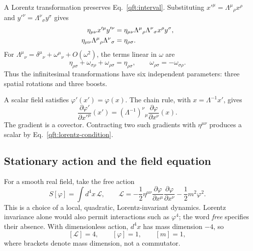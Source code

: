 A Lorentz transformation preserves Eq.~\eqref{qft:interval}. Substituting
$x'^\mu=\Lambda^\mu{}_{\rho}x^\rho$ and
$y'^\nu=\Lambda^\nu{}_{\sigma}y^\sigma$ gives
\begin{align}
 \eta_{\mu\nu}x'^\mu y'^\nu
 &=\eta_{\mu\nu}\Lambda^\mu{}_{\rho}
       \Lambda^\nu{}_{\sigma}x^\rho y^\sigma,\notag\\
 \eta_{\mu\nu}\Lambda^\mu{}_{\rho}
       \Lambda^\nu{}_{\sigma}&=\eta_{\rho\sigma}.
 \label{qft:lorentz-condition}
\end{align}
For $\Lambda^\mu{}_{\nu}=\delta^\mu{}_{\nu}
+\omega^\mu{}_{\nu}+O(\omega^2)$, the terms linear in $\omega$ are
\begin{equation}\label{qft:lorentz-infinitesimal}
 \eta_{\rho\sigma}+\omega_{\sigma\rho}+\omega_{\rho\sigma}
 =\eta_{\rho\sigma},\qquad
 \omega_{\rho\sigma}=-\omega_{\sigma\rho}.
\end{equation}
Thus the infinitesimal transformations have six independent parameters:
three spatial rotations and three boosts.

A scalar field satisfies $\varphi'(x')=\varphi(x)$. The chain rule, with
$x=\Lambda^{-1}x'$, gives
\begin{equation}\label{qft:scalar-gradient}
 \frac{\partial\varphi'}{\partial x'^\mu}(x')
 =(\Lambda^{-1})^\nu{}_{\mu}
   \frac{\partial\varphi}{\partial x^\nu}(x).
\end{equation}
The gradient is a covector. Contracting two such gradients with
$\eta^{\mu\nu}$ produces a scalar by
Eq.~\eqref{qft:lorentz-condition}.

\subsection{Stationary action and the field equation}
For a smooth real field, take the free action
\begin{equation}\label{qft:scalar-action}
 S[\varphi]=\int d^4x\,\mathcal L,\qquad
 \mathcal L=-\frac12\eta^{\mu\nu}
  \frac{\partial\varphi}{\partial x^\mu}
  \frac{\partial\varphi}{\partial x^\nu}
  -\frac12m^2\varphi^2 .
\end{equation}
This is a choice of a local, quadratic, Lorentz-invariant dynamics. Lorentz
invariance alone would also permit interactions such as $\varphi^4$; the
word \emph{free} specifies their absence. With dimensionless action,
$d^4x$ has mass dimension $-4$, so
\begin{equation}\label{qft:scalar-dimensions}
 [\mathcal L]=4,\qquad [\varphi]=1,\qquad [m]=1,
\end{equation}
where brackets denote mass dimension, not a commutator.

